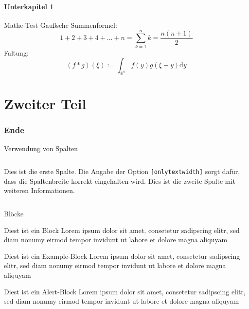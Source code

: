 \documentclass[fleqn,11pt,aspectratio=43]{beamer}
\begin{document}
\subsection{Unterkapitel 1}


\begin{frame}{Mathe-Test}
  Gaußsche Summenformel:
  \[1 + 2 + 3 + 4 + \ldots + n = \sum_{k=1}^n k = \frac{n(n+1)}{2}\]
  Faltung:
  \[(f*g)(\xi) := \int_{\mathbb{R}^n} f(y)g(\xi-y)\mathrm{d}y\]
\end{frame}


\part{Zweiter Teil}


\begin{frame}
  \partpage
\end{frame}


\section{Ende}





\begin{frame}{Verwendung von Spalten}
  \begin{columns}[onlytextwidth]
      Dies ist die erste Spalte.
      Die Angabe der Option \texttt{[onlytextwidth]}
      sorgt dafür, dass die Spaltenbreite korrekt eingehalten wird.
      Dies ist die zweite Spalte mit weiteren Informationen.
  \end{columns}
\end{frame}


\begin{frame}{Blöcke}
  \begin{block}{Diest ist ein Block}
    Lorem ipsum dolor sit amet, consetetur sadipscing elitr, sed diam
    nonumy eirmod tempor invidunt ut labore et dolore magna aliquyam
  \end{block}
  \begin{exampleblock}{Diest ist ein Example-Block}
    Lorem ipsum dolor sit amet, consetetur sadipscing elitr, sed diam
    nonumy eirmod tempor invidunt ut labore et dolore magna aliquyam
  \end{exampleblock}
  \begin{alertblock}{Diest ist ein Alert-Block}
    Lorem ipsum dolor sit amet, consetetur sadipscing elitr, sed diam
    nonumy eirmod tempor invidunt ut labore et dolore magna aliquyam
  \end{alertblock}
\end{frame}
\end{document}
